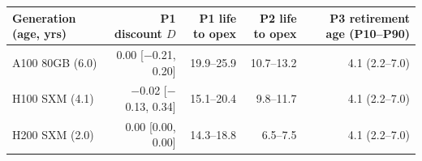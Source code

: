 \begin{tabular}{lrrrr}
\hline
Generation (age, yrs) & P1 discount $D$ & P1 life to opex & P2 life to opex & P3 retirement age (P10--P90) \\
\hline
A100 80GB (6.0) & 0.00 [$-$0.21, 0.20] & 19.9--25.9 & 10.7--13.2 & 4.1 (2.2--7.0) \\
H100 SXM (4.1) & $-$0.02 [$-$0.13, 0.34] & 15.1--20.4 & 9.8--11.7 & 4.1 (2.2--7.0) \\
H200 SXM (2.0) & 0.00 [0.00, 0.00] & 14.3--18.8 & 6.5--7.5 & 4.1 (2.2--7.0) \\
\hline
\end{tabular}

